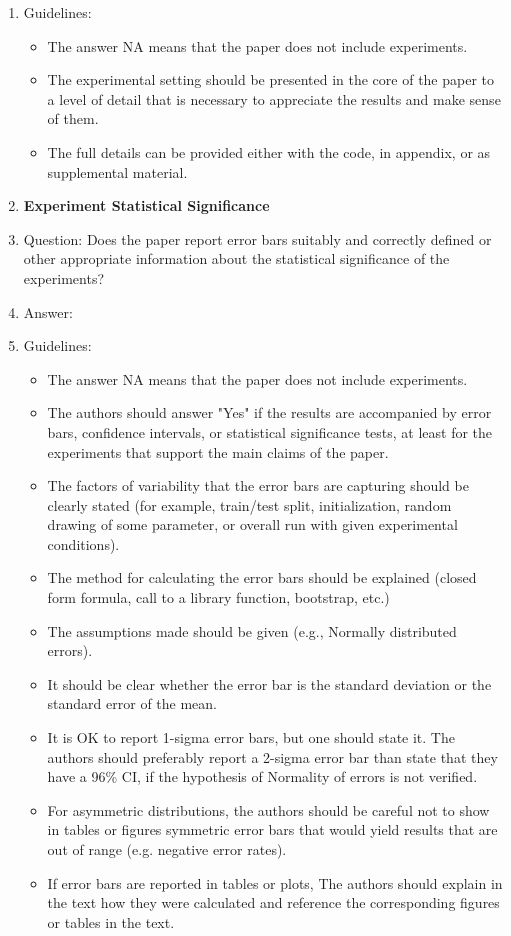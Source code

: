 \documentclass[11pt]{article}
\theoremstyle{plain}
\theoremstyle{definition}
\theoremstyle{remark}
\renewcommand{\^}[1]{^{(#1)}}
\begin{document}
\begin{enumerate}
    \item[] Guidelines:
    \begin{itemize}
        \item The answer NA means that the paper does not include experiments.
        \item The experimental setting should be presented in the core of the paper to a level of detail that is necessary to appreciate the results and make sense of them.
        \item The full details can be provided either with the code, in appendix, or as supplemental material.
    \end{itemize}

\item {\bf Experiment Statistical Significance}
    \item[] Question: Does the paper report error bars suitably and correctly defined or other appropriate information about the statistical significance of the experiments?
    \item[] Answer: \answerNo{} 

    
    \item[] Guidelines:
    \begin{itemize}
        \item The answer NA means that the paper does not include experiments.
        \item The authors should answer "Yes" if the results are accompanied by error bars, confidence intervals, or statistical significance tests, at least for the experiments that support the main claims of the paper.
        \item The factors of variability that the error bars are capturing should be clearly stated (for example, train/test split, initialization, random drawing of some parameter, or overall run with given experimental conditions).
        \item The method for calculating the error bars should be explained (closed form formula, call to a library function, bootstrap, etc.)
        \item The assumptions made should be given (e.g., Normally distributed errors).
        \item It should be clear whether the error bar is the standard deviation or the standard error of the mean.
        \item It is OK to report 1-sigma error bars, but one should state it. The authors should preferably report a 2-sigma error bar than state that they have a 96\% CI, if the hypothesis of Normality of errors is not verified.
        \item For asymmetric distributions, the authors should be careful not to show in tables or figures symmetric error bars that would yield results that are out of range (e.g. negative error rates).
        \item If error bars are reported in tables or plots, The authors should explain in the text how they were calculated and reference the corresponding figures or tables in the text.
    \end{itemize}


\end{enumerate}
\end{document}

